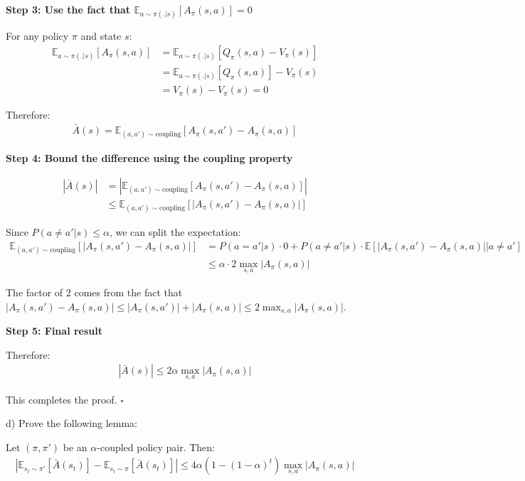 \textbf{Step 3: Use the fact that $\mathbb{E}_{a \sim \pi(.|s)}[A_{\pi}(s, a)] = 0$}

For any policy $\pi$ and state $s$:
\begin{align}
\mathbb{E}_{a \sim \pi(.|s)}[A_{\pi}(s, a)] &= \mathbb{E}_{a \sim \pi(.|s)}[Q_{\pi}(s, a) - V_{\pi}(s)] \\
&= \mathbb{E}_{a \sim \pi(.|s)}[Q_{\pi}(s, a)] - V_{\pi}(s) \\
&= V_{\pi}(s) - V_{\pi}(s) = 0
\end{align}

Therefore:
\begin{align}
\bar{A}(s) = \mathbb{E}_{(a,a') \sim \text{coupling}}[A_{\pi}(s, a') - A_{\pi}(s, a)]
\end{align}

\textbf{Step 4: Bound the difference using the coupling property}

\begin{align}
|\bar{A}(s)| &= \left| \mathbb{E}_{(a,a') \sim \text{coupling}}[A_{\pi}(s, a') - A_{\pi}(s, a)] \right| \\
&\le \mathbb{E}_{(a,a') \sim \text{coupling}}[|A_{\pi}(s, a') - A_{\pi}(s, a)|]
\end{align}

Since $P(a \neq a'|s) \le \alpha$, we can split the expectation:
\begin{align}
\mathbb{E}_{(a,a') \sim \text{coupling}}[|A_{\pi}(s, a') - A_{\pi}(s, a)|] &= P(a = a'|s) \cdot 0 + P(a \neq a'|s) \cdot \mathbb{E}[|A_{\pi}(s, a') - A_{\pi}(s, a)| | a \neq a'] \\
&\le \alpha \cdot 2\max_{s, a}|A_{\pi}(s,a)|
\end{align}

The factor of 2 comes from the fact that $|A_{\pi}(s, a') - A_{\pi}(s, a)| \le |A_{\pi}(s, a')| + |A_{\pi}(s, a)| \le 2\max_{s, a}|A_{\pi}(s,a)|$.

\textbf{Step 5: Final result}

Therefore:
\begin{align}
|\bar{A}(s)| \le 2\alpha \max_{s, a}|A_{\pi}(s,a)|
\end{align}

This completes the proof. $\square$

d) Prove the following lemma:

\begin{lemma}
    Let $(\pi, \pi')$ be an $\alpha$-coupled policy pair. Then:
    \begin{align*}
        |\mathbb{E}_{s_t \sim \pi'}[\bar{A}(s_t)] - \mathbb{E}_{s_t \sim \pi}[\bar{A}(s_t)]| \le 4\alpha(1-(1-\alpha)^t)\max_{s, a}|A_\pi(s, a)|
    \end{align*}
\end{lemma}

